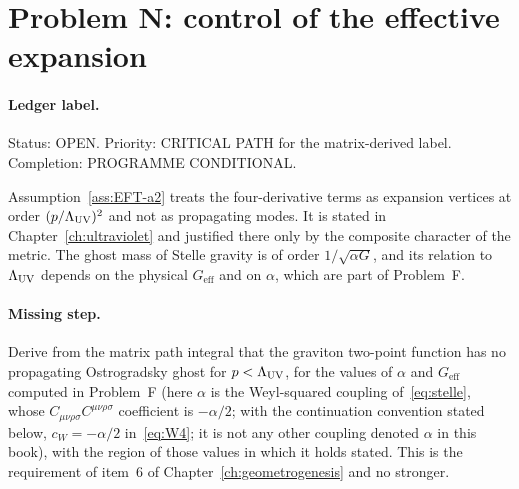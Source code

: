 \section{Problem N: control of the effective expansion}
\label{sec:status-N}

\paragraph{Ledger label.}
Status: OPEN. Priority: CRITICAL PATH for the matrix-derived label.
Completion: PROGRAMME CONDITIONAL.

Assumption~\ref{ass:EFT-a2} treats the four-derivative terms as
expansion vertices at order \((p/\Lambda_{\mathrm{UV}})^2\) and not as propagating
modes. It is stated in Chapter~\ref{ch:ultraviolet} and justified
there only by the composite character of the metric. The ghost mass
of Stelle gravity is of order \(1/\sqrt{\alpha G}\), and its relation
to \(\Lambda_{\mathrm{UV}}\) depends on the physical \(G_{\mathrm{eff}}\) and on
\(\alpha\), which are part of Problem~F.

\paragraph{Missing step.}
Derive from the matrix path integral that the graviton two-point
function has no propagating Ostrogradsky ghost for \(p<\Lambda_{\mathrm{UV}}\), for
the values of \(\alpha\) and \(G_{\mathrm{eff}}\) computed in Problem~F (here \(\alpha\) is the Weyl-squared coupling
of~\eqref{eq:stelle}, whose \(C_{\mu\nu\rho\sigma}C^{\mu\nu\rho\sigma}\)
coefficient is \(-\alpha/2\); with the continuation convention stated
below, \(c_W=-\alpha/2\) in~\eqref{eq:W4}; it is not any other coupling
denoted \(\alpha\) in this book), with the region of those values in which it holds stated.
This is the requirement of item~6 of Chapter~\ref{ch:geometrogenesis}
and no stronger.

